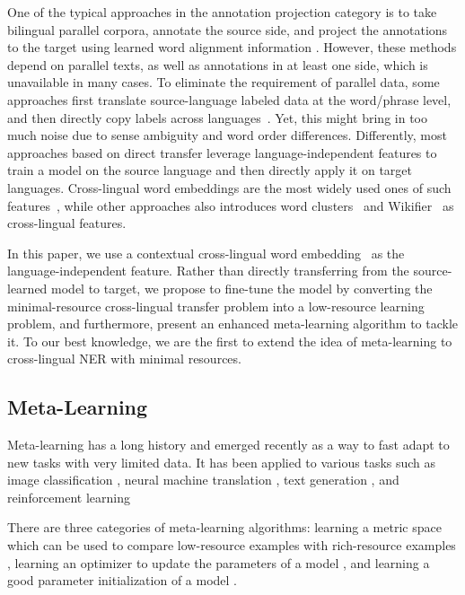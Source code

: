 \documentclass[letterpaper]{article} \usepackage{aaai20}  \usepackage{times}  \usepackage{helvet} \usepackage{courier}  \usepackage[hyphens]{url}  \usepackage{graphicx} \urlstyle{rm} \def\UrlFont{\rm}  \usepackage{graphicx}
\begin{document}
One of the typical approaches in the annotation projection category is to take bilingual parallel corpora, annotate the source side, and project the annotations to the target using learned word alignment information \cite{ni2017weakly}. However, these methods depend on parallel texts, as well as annotations in at least one side, which is unavailable in many cases.
To eliminate the requirement of parallel data, some approaches first translate source-language labeled data at the word/phrase level, and then directly copy labels across languages~\cite{xie2018neural,mayhew2017cheap}.
Yet, this might bring in too much noise due to sense ambiguity and word order differences. 
Differently, most approaches based on direct transfer leverage language-independent features to train a model on the source language and then directly apply it on target languages.
Cross-lingual word embeddings are the most widely used ones of such features~\cite{ni2017weakly,devlin2019bert}, while other approaches also introduces word clusters~\cite{tackstrom2012} and Wikifier~\cite{tsai2016cross} as cross-lingual features. 

In this paper, we use a contextual cross-lingual word embedding~\cite{devlin2019bert} as the language-independent feature. 
Rather than directly transferring from the source-learned model to target, we propose to fine-tune the model by converting the minimal-resource cross-lingual transfer problem into a low-resource learning problem, and furthermore, present an enhanced meta-learning algorithm to tackle it. 
To our best knowledge, we are the first to extend the idea of meta-learning to cross-lingual NER with minimal resources.

\subsection{Meta-Learning}
Meta-learning has a long history \cite{naik1992meta} and emerged recently as a way to fast adapt to new tasks with very limited data.
It has been applied to various tasks such as image classification \cite{koch2015siamese,ravi2017optimization}, neural machine translation \cite{gu2018meta}, text generation \cite{huang2018natural,qian2019domain}, and reinforcement learning \cite{finn2017model,li2018learning}

There are three categories of meta-learning algorithms:
learning a metric space which can be used to compare low-resource examples with rich-resource examples \cite{vinyals2016matching,sung2018learning}, learning an optimizer to update the parameters of a model \cite{andrychowicz2016learning,chen2018meta}, and learning a good parameter initialization of a model \cite{finn2017model,mi2019meta}. 
\end{document}
